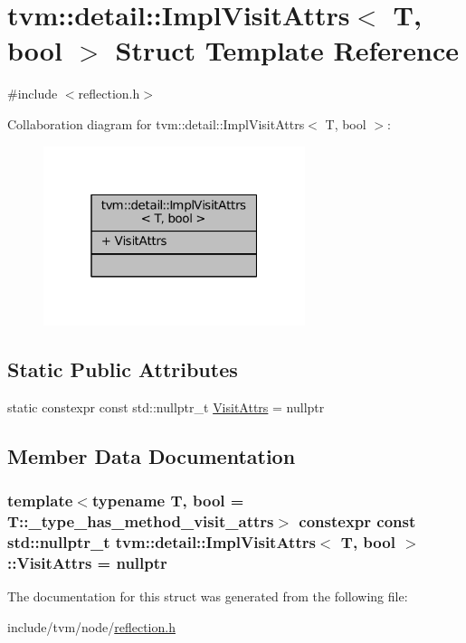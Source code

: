 \hypertarget{structtvm_1_1detail_1_1ImplVisitAttrs}{}\section{tvm\+:\+:detail\+:\+:Impl\+Visit\+Attrs$<$ T, bool $>$ Struct Template Reference}
\label{structtvm_1_1detail_1_1ImplVisitAttrs}


{\ttfamily \#include $<$reflection.\+h$>$}



Collaboration diagram for tvm\+:\+:detail\+:\+:Impl\+Visit\+Attrs$<$ T, bool $>$\+:
\nopagebreak
\begin{figure}[H]
\begin{center}
\leavevmode
\includegraphics[width=217pt]{structtvm_1_1detail_1_1ImplVisitAttrs__coll__graph}
\end{center}
\end{figure}
\subsection*{Static Public Attributes}
\begin{DoxyCompactItemize}
\item 
static constexpr const std\+::nullptr\+\_\+t \hyperlink{structtvm_1_1detail_1_1ImplVisitAttrs_afd7588fbc6336565b47c77d04b0ab69b}{Visit\+Attrs} = nullptr
\end{DoxyCompactItemize}


\subsection{Member Data Documentation}
\subsubsection[{\texorpdfstring{Visit\+Attrs}{VisitAttrs}}]{\setlength{\rightskip}{0pt plus 5cm}template$<$typename T, bool  = T\+::\+\_\+type\+\_\+has\+\_\+method\+\_\+visit\+\_\+attrs$>$ constexpr const std\+::nullptr\+\_\+t {\bf tvm\+::detail\+::\+Impl\+Visit\+Attrs}$<$ T, bool $>$\+::Visit\+Attrs = nullptr\hspace{0.3cm}{\ttfamily [static]}}\hypertarget{structtvm_1_1detail_1_1ImplVisitAttrs_afd7588fbc6336565b47c77d04b0ab69b}{}\label{structtvm_1_1detail_1_1ImplVisitAttrs_afd7588fbc6336565b47c77d04b0ab69b}


The documentation for this struct was generated from the following file\+:\begin{DoxyCompactItemize}
\item 
include/tvm/node/\hyperlink{reflection_8h}{reflection.\+h}\end{DoxyCompactItemize}
